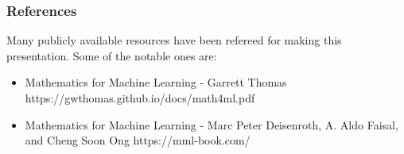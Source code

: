 \begin{frame}\frametitle{References}
Many publicly available resources have been refereed for making this presentation. Some of the notable ones are:
\small
\begin{itemize}
\item Mathematics for Machine Learning - Garrett Thomas https://gwthomas.github.io/docs/math4ml.pdf
\item Mathematics for Machine Learning - Marc Peter Deisenroth, A. Aldo Faisal, and Cheng Soon Ong https://mml-book.com/
\end{itemize}
\end{frame}

